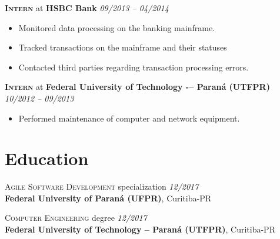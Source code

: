 \documentclass[a4paper,12pt]{article}
\begin{document}
\textbf{\textsc{Intern}} at \textbf{HSBC Bank} \hfill \textit{09/2013 -- 04/2014}
{\small
\begin{itemize}[leftmargin=*,label=\large\textbullet]
    \setlength\itemsep{-0.2em}
    \item Monitored data processing on the banking mainframe.
    \item Tracked transactions on the mainframe and their statuses
    \item Contacted third parties regarding transaction processing errors.
\end{itemize}
}

\textbf{\textsc{Intern}} at \textbf{Federal University of Technology -– Paraná (UTFPR)} \hfill \textit{10/2012 -- 09/2013}
{\small
\begin{itemize}[leftmargin=*,label=\large\textbullet]
    \setlength\itemsep{-0.2em}
    \item Performed maintenance of computer and network equipment.
\end{itemize}
}

\section{Education}
\vspace{6pt}

\textsc{Agile Software Development} specialization \hfill \textit{12/2017}\\
\normalsize\textbf{Federal University of Paraná (UFPR)}, Curitiba-PR

\textsc{Computer Engineering} degree \hfill \textit{12/2017}\\
\normalsize\textbf{Federal University of Technology – Paraná (UTFPR)}, Curitiba-PR
\end{document}
